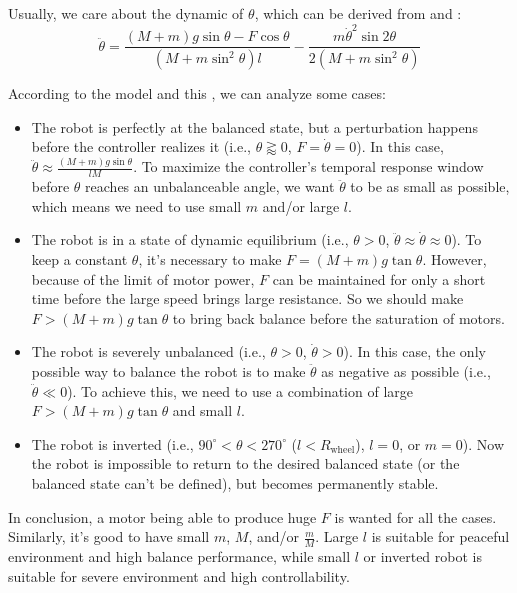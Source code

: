 \documentclass[9pt,a4paper,twocolumn]{tau-class/tau}
\begin{document}
Usually, we care about the dynamic of $\theta$, which can be derived from  and :
\begin{equation}
	\ddot{\theta}=\frac{(M+m)g\sin{\theta}-F\cos{\theta}}{(M+m\sin^2{\theta})l}-\frac{m\dot{\theta}^2\sin{2\theta}}{2(M+m\sin^2{\theta})}
    \label{eq:theta_dynamic}
\end{equation}

According to the model  and this , we can analyze some cases:
\begin{itemize}
	\item The robot is perfectly at the balanced state, but a perturbation happens before the controller realizes it (i.e., $\theta\gtrapprox0$, $F=\dot{\theta}=0$). In this case, $\ddot{\theta}\approx\frac{(M+m)g\sin{\theta}}{lM}$. To maximize the controller's temporal response window before $\theta$ reaches an unbalanceable angle, we want $\ddot{\theta}$ to be as small as possible, which means we need to use small $m$ and/or large $l$.
	\item The robot is in a state of dynamic equilibrium (i.e., $\theta>0$, $\ddot{\theta}\approx\dot{\theta}\approx0$). To keep a constant $\theta$, it's necessary to make $F=(M+m)g\tan{\theta}$. However, because of the limit of motor power, $F$ can be maintained for only a short time before the large speed brings large resistance. So we should make $F>(M+m)g\tan{\theta}$ to bring back balance before the saturation of motors.
	\item The robot is severely unbalanced (i.e., $\theta>0$, $\dot{\theta}>0$). In this case, the only possible way to balance the robot is to make $\ddot{\theta}$ as negative as possible (i.e., $\ddot{\theta}\ll0$). To achieve this, we need to use a combination of large $F>(M+m)g\tan{\theta}$ and small $l$.
	\item The robot is inverted (i.e., $90^\circ<\theta<270^\circ$ ($l<R_\text{wheel}$), $l=0$, or $m=0$). Now the robot is impossible to return to the desired balanced state (or the balanced state can't be defined), but becomes permanently stable.
\end{itemize}
In conclusion, a motor being able to produce huge $F$ is wanted for all the cases. Similarly, it's good to have small $m$, $M$, and/or $\frac{m}{M}$. Large $l$ is suitable for peaceful environment and high balance performance, while small $l$ or inverted robot is suitable for severe environment and high controllability. 
\end{document}
